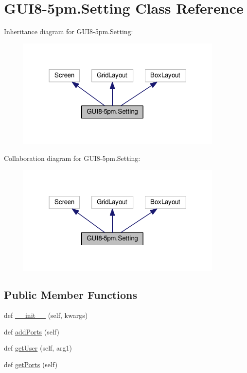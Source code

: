 \hypertarget{classGUI8-5pm_1_1Setting}{}\section{G\+U\+I8-\/5pm.Setting Class Reference}
\label{classGUI8-5pm_1_1Setting}


Inheritance diagram for G\+U\+I8-\/5pm.Setting\+:\nopagebreak
\begin{figure}[H]
\begin{center}
\leavevmode
\includegraphics[width=291pt]{classGUI8-5pm_1_1Setting__inherit__graph}
\end{center}
\end{figure}


Collaboration diagram for G\+U\+I8-\/5pm.Setting\+:\nopagebreak
\begin{figure}[H]
\begin{center}
\leavevmode
\includegraphics[width=291pt]{classGUI8-5pm_1_1Setting__coll__graph}
\end{center}
\end{figure}
\subsection*{Public Member Functions}
\begin{DoxyCompactItemize}
\item 
def \hyperlink{classGUI8-5pm_1_1Setting_a29acedf9f6d1fed8c67e37c4df2cf052}{\+\_\+\+\_\+init\+\_\+\+\_\+} (self, kwargs)
\item 
def \hyperlink{classGUI8-5pm_1_1Setting_aebd7039901060675bb62a27394fc7bfa}{add\+Ports} (self)
\item 
def \hyperlink{classGUI8-5pm_1_1Setting_ac5e43e9c3dec5b93ca04c5b3de5c87a7}{get\+User} (self, arg1)
\item 
def \hyperlink{classGUI8-5pm_1_1Setting_ae3058b4bb2dc5e6b305694220f81b9f7}{get\+Ports} (self)
\end{DoxyCompactItemize}
